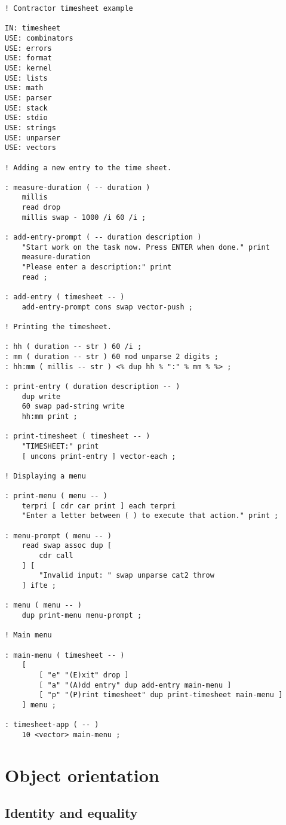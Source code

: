 \documentclass[english]{article}
\begin{document}
\begin{verbatim}
! Contractor timesheet example

IN: timesheet
USE: combinators
USE: errors
USE: format
USE: kernel
USE: lists
USE: math
USE: parser
USE: stack
USE: stdio
USE: strings
USE: unparser
USE: vectors

! Adding a new entry to the time sheet.

: measure-duration ( -- duration )
    millis
    read drop
    millis swap - 1000 /i 60 /i ;

: add-entry-prompt ( -- duration description )
    "Start work on the task now. Press ENTER when done." print
    measure-duration
    "Please enter a description:" print
    read ;

: add-entry ( timesheet -- )
    add-entry-prompt cons swap vector-push ;

! Printing the timesheet.

: hh ( duration -- str ) 60 /i ;
: mm ( duration -- str ) 60 mod unparse 2 digits ;
: hh:mm ( millis -- str ) <% dup hh % ":" % mm % %> ;

: print-entry ( duration description -- )
    dup write
    60 swap pad-string write
    hh:mm print ;

: print-timesheet ( timesheet -- )
    "TIMESHEET:" print
    [ uncons print-entry ] vector-each ;

! Displaying a menu

: print-menu ( menu -- )
    terpri [ cdr car print ] each terpri
    "Enter a letter between ( ) to execute that action." print ;

: menu-prompt ( menu -- )
    read swap assoc dup [
        cdr call
    ] [
        "Invalid input: " swap unparse cat2 throw
    ] ifte ;

: menu ( menu -- )
    dup print-menu menu-prompt ;

! Main menu

: main-menu ( timesheet -- )
    [
        [ "e" "(E)xit" drop ]
        [ "a" "(A)dd entry" dup add-entry main-menu ]
        [ "p" "(P)rint timesheet" dup print-timesheet main-menu ]
    ] menu ;

: timesheet-app ( -- )
    10 <vector> main-menu ;
\end{verbatim}

\section{Object orientation}

\subsection{Identity and equality}
\end{document}
